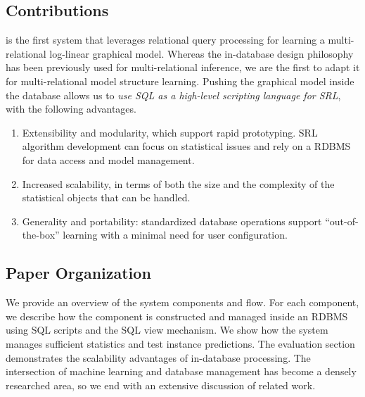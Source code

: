 \subsection{Contributions}
\FB  is the first system that leverages relational query processing for learning a multi-relational log-linear graphical model. Whereas the in-database design philosophy has been previously used for multi-relational inference, we are the first to adapt it for multi-relational model structure learning. Pushing the graphical model inside the database 
allows us to {\em use SQL as a high-level scripting language for SRL}, with the following advantages.

\begin{enumerate}
\item Extensibility and modularity, which support rapid prototyping. SRL algorithm development can focus on statistical issues and rely on a RDBMS for data access and model management.
\item Increased scalability, in terms of both the size and the complexity of the statistical objects that can be handled.
\item Generality and portability: standardized database operations support ``out-of-the-box'' learning with a minimal need for user configuration.
\end{enumerate}
\subsection{Paper Organization}
We provide an overview of the system components and flow. For each component, we describe how the component is constructed and managed inside an RDBMS using SQL scripts and the SQL view mechanism. We show how the system manages sufficient statistics and test instance predictions. The evaluation section demonstrates the scalability advantages of in-database processing. The intersection of machine learning and database management has become a densely researched area, so we end with an extensive discussion of related work. 




